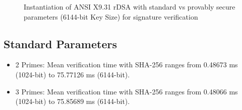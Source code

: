\documentclass[]{final_report}
\theoremstyle{definition}
\begin{document}
\begin{figure}[H]
    \centering %
     \caption{Instantiation of ANSI X9.31 rDSA with standard vs provably secure parameters (6144-bit Key Size) for signature verification}
    \begin{minipage}{\textwidth}
        \centering
    \end{minipage}
         \label{ansi_verify_6144bit_table}
\end{figure}



\subsection*{Standard Parameters}
\begin{itemize}
\item 2 Primes: Mean verification time with SHA-256 ranges from 0.48673 ms (1024-bit) to 75.77126 ms (6144-bit).
\item 3 Primes: Mean verification time with SHA-256 ranges from 0.48066 ms (1024-bit) to 75.85689 ms (6144-bit).
\end{itemize}
\end{document}
